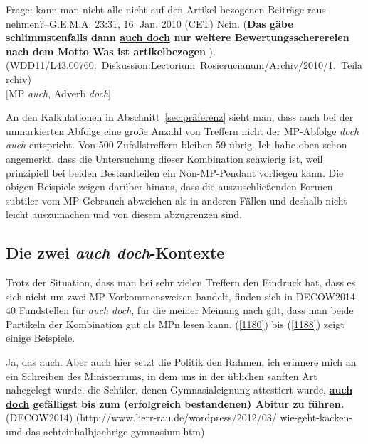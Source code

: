 {\begin{exe}
	\ex\label{1179} 
	\scriptsize
	{Frage: kann man nicht alle nicht auf den Artikel bezogenen Beiträge raus nehmen?--G.E.M.A. 23:31, 16. Jan. 2010 (CET)
	Nein. (\textbf{Das gäbe schlimmstenfalls dann \underline{auch doch} nur weitere Bewertungs\-scherereien nach dem Motto \glqq Was ist artikelbezogen			\grqq{}}). 
	\newline
	\hbox{}\hfill\hbox{(WDD11/L43.00760: Diskussion:Lectorium Rosicrucianum/Archiv/2010/1. Teilarchiv)}}\\	
	$[$MP \textit{auch}, Adverb \textit{doch}$]$
\end{exe}
An den Kalkulationen in Abschnitt~\ref{sec:präferenz} sieht man, dass auch bei der unmarkierten Abfolge eine große Anzahl von Treffern nicht der MP-Abfolge \textit{doch auch} entspricht. Von 500 Zufallstreffern bleiben 59 übrig. Ich habe oben schon angemerkt, dass die Untersuchung dieser Kombination schwierig ist, weil prinzipiell bei beiden Bestandteilen ein Non-MP-Pendant vorliegen kann. Die obigen Beispiele zeigen darüber hinaus, dass die auszuschließenden Formen subtiler vom MP-Gebrauch abweichen als in anderen Fällen und deshalb nicht leicht auszumachen und von diesem abzugrenzen sind. 	

\subsection{Die zwei \textit{auch doch}-Kontexte}
Trotz der Situation, dass man bei sehr vielen Treffern den Eindruck hat, dass es sich nicht um zwei MP-Vorkommensweisen handelt, finden sich in DECOW2014 40 Fundstellen für \textit{auch doch}, für die meiner Meinung nach gilt, dass man beide Partikeln der Kombination gut als MPn lesen kann. (\ref{1180}) bis (\ref{1188}) zeigt einige Beispiele.

\begin{exe}
	\ex\label{1180} 
	\scriptsize
	Ja, das auch. Aber auch hier setzt die Politik den Rahmen, ich erinnere mich an ein Schreiben des Ministeriums, in dem uns in der üblichen sanften Art 		nahegelegt wurde, die Schüler, denen Gymnasialeignung attestiert wurde, \textbf{\underline{auch doch} gefälligst bis zum (erfolgreich bestandenen) 			Abitur zu führen.}
	\hfill\hbox{(DECOW2014)}	
	\newline
	\hbox{}\hfill\hbox{(http://www.herr-rau.de/wordpress/2012/03/}
	\newline
	\hbox{}\hfill\hbox{wie-geht-kacken-und-das-achteinhalbjaehrige-gymnasium.htm)}
\end{exe}

}
